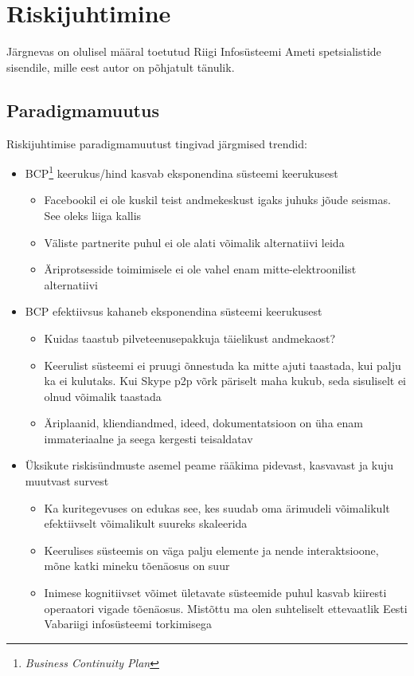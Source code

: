 \documentclass{tufte-book}
\begin{document}
\chapter{Riskijuhtimine}
Järgnevas on olulisel määral toetutud Riigi Infosüsteemi Ameti spetsialistide sisendile, mille eest autor on põhjatult tänulik.

\section{Paradigmamuutus}
Riskijuhtimise paradigmamuutust tingivad järgmised trendid:
	\begin{itemize}
		\item BCP\footnote{\emph{Business Continuity Plan}} keerukus/hind kasvab eksponendina süsteemi keerukusest
			\begin{itemize}
		\item Facebookil ei ole kuskil teist andmekeskust igaks juhuks jõude seismas. See oleks liiga kallis
		\item Väliste partnerite puhul ei ole alati võimalik alternatiivi leida
		\item Äriprotsesside toimimisele ei ole vahel enam mitte-elektroonilist alternatiivi
	\end{itemize}

		\item BCP efektiivsus kahaneb eksponendina süsteemi keerukusest
			\begin{itemize}
		\item Kuidas taastub pilveteenusepakkuja täielikust andmekaost?
		\item Keerulist süsteemi ei pruugi õnnestuda ka mitte ajuti taastada, kui palju ka ei kulutaks. Kui Skype p2p võrk päriselt maha kukub, seda sisuliselt ei olnud võimalik taastada
		\item Äriplaanid, kliendiandmed, ideed, dokumentatsioon on üha enam immateriaalne ja seega kergesti teisaldatav
	\end{itemize}

		\item Üksikute riskisündmuste asemel peame rääkima pidevast, kasvavast ja kuju muutvast survest
			\begin{itemize}
		\item Ka kuritegevuses on edukas see, kes suudab oma ärimudeli võimalikult efektiivselt võimalikult suureks skaleerida
		\item Keerulises süsteemis on väga palju elemente ja nende interaktsioone, mõne katki mineku tõenäosus on suur
		\item Inimese kognitiivset võimet ületavate süsteemide puhul kasvab kiiresti operaatori vigade tõenäosus. Mistõttu ma olen suhteliselt ettevaatlik Eesti Vabariigi infosüsteemi torkimisega
	\end{itemize}


\end{itemize}
\end{document}
